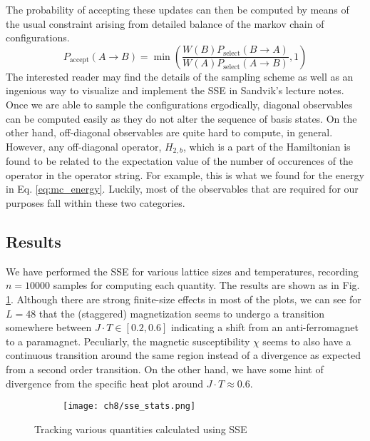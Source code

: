 The probability of accepting these updates can then be computed by means of the usual constraint arising from detailed balance of the markov chain of configurations.
\begin{equation}
    P_{\text{accept}}(A \to B) = \min \left (\frac{W(B)P_{\text{select}}(B \to A)}{W(A)P_{\text{select}}(A \to B)}, 1\right )
\end{equation}
The interested reader may find the details of the sampling scheme as well as an ingenious way to visualize and implement the SSE in Sandvik's lecture notes\cite{Sandvik_2010}. 
\vspace{0.5cm}\\
Once we are able to sample the configurations ergodically, diagonal observables can be computed easily as they do not alter the sequence of basis states. On the other hand, off-diagonal observables are quite hard to compute, in general. However, any off-diagonal operator, $H_{2, b}$, which is a part of the Hamiltonian is found to be related to the expectation value of the number of occurences of the operator in the operator string\cite{Sandvik_2010}. For example, this is what we found for the energy in Eq. \eqref{eq:mc_energy}. Luckily, most of the observables that are required for our purposes fall within these two categories.

\subsection{Results}
We have performed the SSE for various lattice sizes and temperatures, recording $n=10000$ samples for computing each quantity. The results are shown as in Fig. \ref{fig:sse_res}. Although there are strong finite-size effects in most of the plots, we can see for $L=48$ that the (staggered) magnetization seems to undergo a transition somewhere between $J \cdot T \in [0.2, 0.6]$ indicating a shift from an anti-ferromagnet to a paramagnet. Peculiarly, the magnetic susceptibility $\chi$ seems to also have a continuous transition around the same region instead of a divergence as expected from a second order transition. On the other hand, we have some hint of divergence from the specific heat plot around $J\cdot T \approx 0.6$. 

\begin{figure}[!htb]
    \centering
    \begin{subfigure}[b]{\textwidth}  %
        \centering
        \texttt{[image: ch8/sse\_stats.png]}
    \end{subfigure}
    \caption{Tracking various quantities calculated using SSE}
    \label{fig:sse_res}
\end{figure}
\FloatBarrier \!\!\!\!\!\!\!\!\!\!\!

